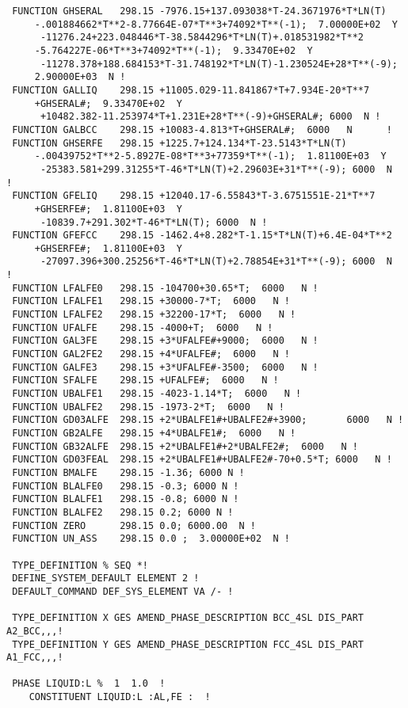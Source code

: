 \documentclass[12pt]{article}
\begin{document}
\begin{appendices}
{\begin{verbatim}
 FUNCTION GHSERAL   298.15 -7976.15+137.093038*T-24.3671976*T*LN(T)
     -.001884662*T**2-8.77664E-07*T**3+74092*T**(-1);  7.00000E+02  Y
      -11276.24+223.048446*T-38.5844296*T*LN(T)+.018531982*T**2
     -5.764227E-06*T**3+74092*T**(-1);  9.33470E+02  Y
      -11278.378+188.684153*T-31.748192*T*LN(T)-1.230524E+28*T**(-9);  
     2.90000E+03  N !
 FUNCTION GALLIQ    298.15 +11005.029-11.841867*T+7.934E-20*T**7
     +GHSERAL#;  9.33470E+02  Y
      +10482.382-11.253974*T+1.231E+28*T**(-9)+GHSERAL#; 6000  N !
 FUNCTION GALBCC    298.15 +10083-4.813*T+GHSERAL#;  6000   N      !
 FUNCTION GHSERFE   298.15 +1225.7+124.134*T-23.5143*T*LN(T)
     -.00439752*T**2-5.8927E-08*T**3+77359*T**(-1);  1.81100E+03  Y
      -25383.581+299.31255*T-46*T*LN(T)+2.29603E+31*T**(-9); 6000  N   !
 FUNCTION GFELIQ    298.15 +12040.17-6.55843*T-3.6751551E-21*T**7
     +GHSERFE#;  1.81100E+03  Y
      -10839.7+291.302*T-46*T*LN(T); 6000  N !
 FUNCTION GFEFCC    298.15 -1462.4+8.282*T-1.15*T*LN(T)+6.4E-04*T**2
     +GHSERFE#;  1.81100E+03  Y
      -27097.396+300.25256*T-46*T*LN(T)+2.78854E+31*T**(-9); 6000  N      !
 FUNCTION LFALFE0   298.15 -104700+30.65*T;  6000   N !
 FUNCTION LFALFE1   298.15 +30000-7*T;  6000   N !
 FUNCTION LFALFE2   298.15 +32200-17*T;  6000   N !
 FUNCTION UFALFE    298.15 -4000+T;  6000   N !
 FUNCTION GAL3FE    298.15 +3*UFALFE#+9000;  6000   N !
 FUNCTION GAL2FE2   298.15 +4*UFALFE#;  6000   N !
 FUNCTION GALFE3    298.15 +3*UFALFE#-3500;  6000   N !
 FUNCTION SFALFE    298.15 +UFALFE#;  6000   N !
 FUNCTION UBALFE1   298.15 -4023-1.14*T;  6000   N !
 FUNCTION UBALFE2   298.15 -1973-2*T;  6000   N !
 FUNCTION GD03ALFE  298.15 +2*UBALFE1#+UBALFE2#+3900;       6000   N !
 FUNCTION GB2ALFE   298.15 +4*UBALFE1#;  6000   N !
 FUNCTION GB32ALFE  298.15 +2*UBALFE1#+2*UBALFE2#;  6000   N !
 FUNCTION GD03FEAL  298.15 +2*UBALFE1#+UBALFE2#-70+0.5*T; 6000   N !
 FUNCTION BMALFE    298.15 -1.36; 6000 N !
 FUNCTION BLALFE0   298.15 -0.3; 6000 N !
 FUNCTION BLALFE1   298.15 -0.8; 6000 N !
 FUNCTION BLALFE2   298.15 0.2; 6000 N !
 FUNCTION ZERO      298.15 0.0; 6000.00  N !
 FUNCTION UN_ASS    298.15 0.0 ;  3.00000E+02  N !
 
 TYPE_DEFINITION % SEQ *!
 DEFINE_SYSTEM_DEFAULT ELEMENT 2 !
 DEFAULT_COMMAND DEF_SYS_ELEMENT VA /- !

 TYPE_DEFINITION X GES AMEND_PHASE_DESCRIPTION BCC_4SL DIS_PART A2_BCC,,,!
 TYPE_DEFINITION Y GES AMEND_PHASE_DESCRIPTION FCC_4SL DIS_PART A1_FCC,,,!

 PHASE LIQUID:L %  1  1.0  !
    CONSTITUENT LIQUID:L :AL,FE :  !


\end{verbatim}}
\end{appendices}
\end{document}
